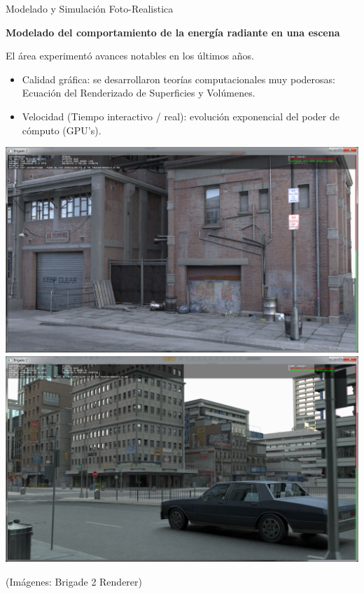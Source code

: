 \documentclass[spanish]{beamer}
\begin{document}
\begin{frame}{Modelado y Simulación Foto-Realistica}

\textbf{Modelado del comportamiento de la energía radiante en una escena}

El área experimentó avances notables en los últimos años.
\begin{block}{}
\begin{itemize}
\item Calidad gráfica: se desarrollaron teorías computacionales muy poderosas: Ecuación del Renderizado de Superficies y Volúmenes.
\item Velocidad (Tiempo interactivo / real): evolución exponencial del poder de cómputo (GPU's).
\end{itemize}
\end{block}

\includegraphics[scale = 0.15]{figures/hd1.png}
\includegraphics[scale = 0.15]{figures/blinn5ed.png}

(Imágenes: Brigade 2 Renderer)


\end{frame}
\end{document}
